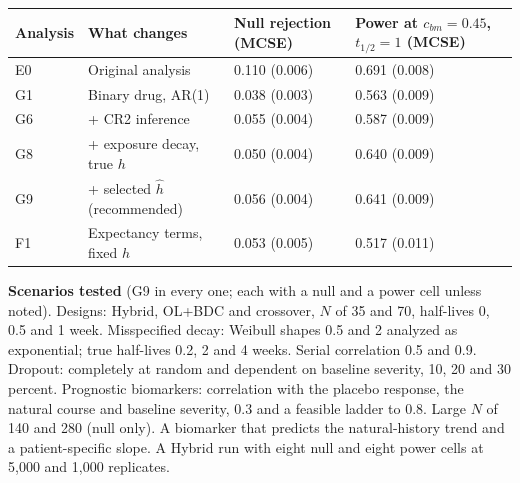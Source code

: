 \documentclass[
  9pt,
]{article}
\begin{document}
\begin{table}
\centering\begingroup\fontsize{8}{10}\selectfont

\begin{tabular}{llll}
\toprule
Analysis & What changes & Null rejection (MCSE) & Power at $c_{bm}=0.45$, $t_{1/2}=1$ (MCSE)\\
\midrule
E0 & Original analysis & 0.110 (0.006) & 0.691 (0.008)\\
G1 & Binary drug, AR(1) & 0.038 (0.003) & 0.563 (0.009)\\
G6 & + CR2 inference & 0.055 (0.004) & 0.587 (0.009)\\
G8 & + exposure decay, true $h$ & 0.050 (0.004) & 0.640 (0.009)\\
G9 & + selected $\hat h$ (recommended) & 0.056 (0.004) & 0.641 (0.009)\\
F1 & Expectancy terms, fixed $h$ & 0.053 (0.005) & 0.517 (0.011)\\
\bottomrule
\end{tabular}
\endgroup{}
\end{table}

\textbf{Scenarios tested} (G9 in every one; each with a null and a power
cell unless noted). Designs: Hybrid, OL+BDC and crossover, \(N\) of 35
and 70, half-lives 0, 0.5 and 1 week. Misspecified decay: Weibull shapes
0.5 and 2 analyzed as exponential; true half-lives 0.2, 2 and 4 weeks.
Serial correlation 0.5 and 0.9. Dropout: completely at random and
dependent on baseline severity, 10, 20 and 30 percent. Prognostic
biomarkers: correlation with the placebo response, the natural course
and baseline severity, 0.3 and a feasible ladder to 0.8. Large \(N\) of
140 and 280 (null only). A biomarker that predicts the natural-history
trend and a patient-specific slope. A Hybrid run with eight null and
eight power cells at 5,000 and 1,000 replicates.
\end{document}
